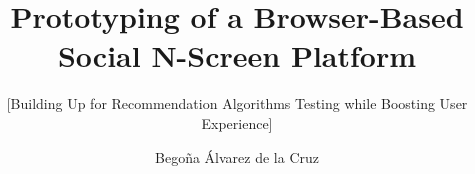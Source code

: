 \documentclass{acm_proc_article-sp}
\begin{document}
\title{Prototyping of a Browser-Based Social N-Screen Platform}
\subtitle{[Building Up for Recommendation Algorithms Testing while Boosting User Experience]
}
%
%
%
%
%

%
\author{
%
%
\alignauthor
Bego\~na \'Alvarez de la Cruz\\
       \\
       \\
       \\
}
\end{document}
